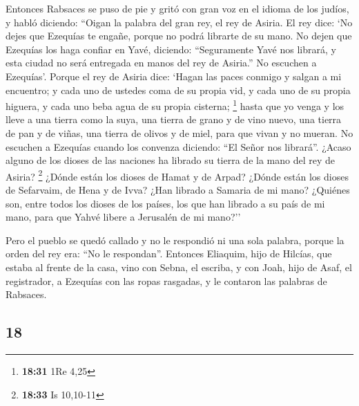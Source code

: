 \begin{paracol}{2}
 Entonces Rabsaces se puso de pie y gritó con gran voz en
el idioma de los judíos, y habló diciendo: ``Oigan la palabra del gran
rey, el rey de Asiria.  El rey dice: `No dejes que
Ezequías te engañe, porque no podrá librarte de su mano. 
No dejen que Ezequías los haga confiar en Yavé, diciendo: ``Seguramente
Yavé nos librará, y esta ciudad no será entregada en manos del rey de
Asiria.''  No escuchen a Ezequías'. Porque el rey de
Asiria dice: `Hagan las paces conmigo y salgan a mi encuentro; y cada
uno de ustedes coma de su propia vid, y cada uno de su propia higuera, y
cada uno beba agua de su propia cisterna; \footnote{\textbf{18:31} 1Re
  4,25}  hasta que yo venga y los lleve a una tierra como
la suya, una tierra de grano y de vino nuevo, una tierra de pan y de
viñas, una tierra de olivos y de miel, para que vivan y no mueran. No
escuchen a Ezequías cuando los convenza diciendo: ``El Señor nos
librará''.  ¿Acaso alguno de los dioses de las naciones
ha librado su tierra de la mano del rey de Asiria? \footnote{\textbf{18:33}
  Is 10,10-11}  ¿Dónde están los dioses de Hamat y de
Arpad? ¿Dónde están los dioses de Sefarvaim, de Hena y de Ivva? ¿Han
librado a Samaria de mi mano?  ¿Quiénes son, entre todos
los dioses de los países, los que han librado a su país de mi mano, para
que Yahvé libere a Jerusalén de mi mano?''

 Pero el pueblo se quedó callado y no le respondió ni una
sola palabra, porque la orden del rey era: ``No le respondan''.
 Entonces Eliaquim, hijo de Hilcías, que estaba al frente
de la casa, vino con Sebna, el escriba, y con Joah, hijo de Asaf, el
registrador, a Ezequías con las ropas rasgadas, y le contaron las
palabras de Rabsaces.

\switchcolumn
\begin{otherlanguage}{english}

\hypertarget{section-35}{%
\section{18}\label{section-35}}


\end{otherlanguage}
\end{paracol}
